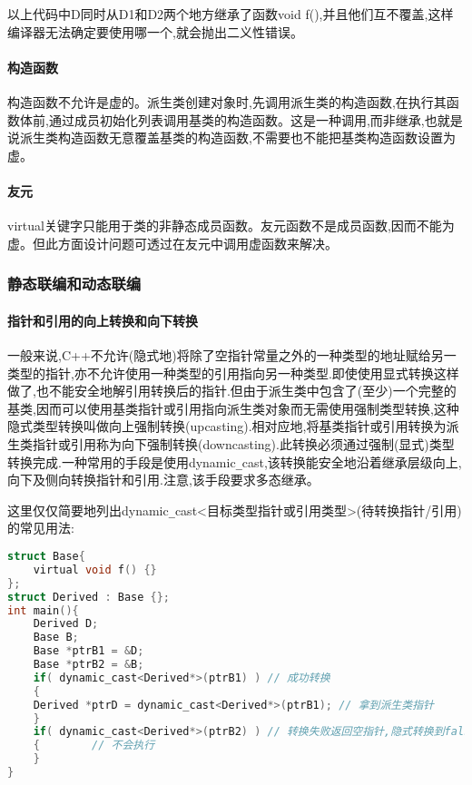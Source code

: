 \documentclass[UTF8]{ctexart}
\begin{document}
以上代码中D同时从D1和D2两个地方继承了函数void f(),并且他们互不覆盖,这样编译器无法确定要使用哪一个,就会抛出二义性错误。

\paragraph{构造函数}
构造函数不允许是虚的。派生类创建对象时,先调用派生类的构造函数,在执行其函数体前,通过成员初始化列表调用基类的构造函数。这是一种调用,而非继承,也就是说派生类构造函数无意覆盖基类的构造函数,不需要也不能把基类构造函数设置为虚。

\paragraph{友元}
virtual关键字只能用于类的非静态成员函数。友元函数不是成员函数,因而不能为虚。但此方面设计问题可透过在友元中调用虚函数来解决。

\subsubsection{静态联编和动态联编}
\paragraph{指针和引用的向上转换和向下转换}
一般来说,C++不允许(隐式地)将除了空指针常量之外的一种类型的地址赋给另一类型的指针,亦不允许使用一种类型的引用指向另一种类型.即使使用显式转换这样做了,也不能安全地解引用转换后的指针.但由于派生类中包含了(至少)一个完整的基类,因而可以使用基类指针或引用指向派生类对象而无需使用强制类型转换,这种隐式类型转换叫做向上强制转换(upcasting).相对应地,将基类指针或引用转换为派生类指针或引用称为向下强制转换(downcasting).此转换必须通过强制(显式)类型转换完成.一种常用的手段是使用dynamic\verb|_|cast,该转换能安全地沿着继承层级向上,向下及侧向转换指针和引用.注意,该手段要求多态继承。

这里仅仅简要地列出dynamic\verb|_|cast<目标类型指针或引用类型>(待转换指针/引用)的常见用法:
\begin{lstlisting}[language = C,basicstyle=\small\ttfamily]
struct Base{ 
    virtual void f() {} 
};
struct Derived : Base {};
int main(){    
    Derived D;    
    Base B;   
    Base *ptrB1 = &D;   
    Base *ptrB2 = &B;
    if( dynamic_cast<Derived*>(ptrB1) ) // 成功转换    
    {        
    Derived *ptrD = dynamic_cast<Derived*>(ptrB1); // 拿到派生类指针    
    }    
    if( dynamic_cast<Derived*>(ptrB2) ) // 转换失败返回空指针,隐式转换到false    
    {        // 不会执行    
    }
}
\end{lstlisting}
\end{document}
